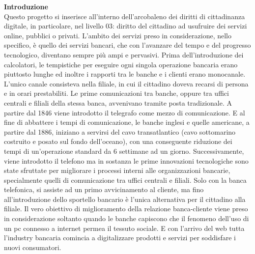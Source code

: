 \documentclass[aip, reprint]{article}
\begin{document}
\newpage


\textbf{Introduzione}\\
Questo progetto si inserisce all’interno dell’arcobaleno dei diritti di cittadinanza digitale, in particolare, nel livello 03: diritto del cittadino ad usufruire dei servizi online, pubblici o privati.
L’ambito dei servizi preso in considerazione, nello specifico, è quello dei servizi bancari, che con l’avanzare del tempo e del progresso tecnologico, diventano sempre più ampi e pervasivi.
Prima dell’introduzione dei calcolatori, le tempistiche per eseguire ogni singola operazione bancaria erano piuttosto lunghe ed inoltre i rapporti tra le banche e i clienti erano monocanale. L’unico canale consisteva nella filiale, in cui il cittadino doveva recarsi di persona e in orari prestabiliti.
Le prime comunicazioni tra banche, oppure tra uffici centrali e filiali della stessa banca, avvenivano tramite posta tradizionale. A partire dal 1846 viene introdotto il telegrafo come mezzo di comunicazione. 
E al fine di abbattere i tempi di comunicazione, le banche inglesi e quelle americane, a partire dal 1886, iniziano a servirsi del cavo transatlantico (cavo sottomarino costruito e posato sul fondo dell’oceano), con una conseguente riduzione dei tempi di un’operazione standard da 6 settimane ad un giorno. 
Successivamente, viene introdotto il telefono ma in sostanza le prime innovazioni tecnologiche sono state sfruttate per migliorare i processi interni alle organizzazioni bancarie, specialmente quelli di comunicazione tra uffici centrali e filiali.
Solo con la banca telefonica, si assiste ad un primo avvicinamento al cliente, ma fino all’introduzione dello sportello bancario è l’unica alternativa per il cittadino alla filiale. 
Il vero obiettivo di miglioramento della relazione banca-cliente viene preso in considerazione soltanto quando le banche capiscono che il fenomeno dell’uso di un pc connesso a internet permea il tessuto sociale. E con l’arrivo del web tutta l’industry bancaria comincia a digitalizzare prodotti e servizi per soddisfare i nuovi consumatori.\\


\end{document}
